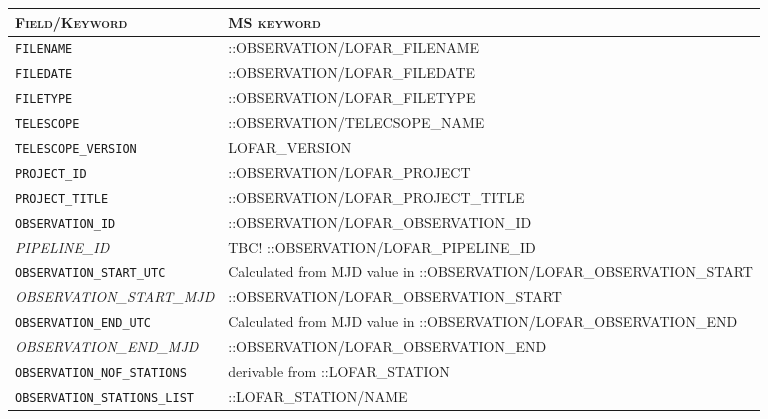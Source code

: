 \documentclass[a4paper,10pt,bibtotoc]{scrartcl}
\begin{document}
\begin{table}[H]
  \centering
  \begin{tabular}{|ll|}


    \hline
    \textsc{Field/Keyword} & \textsc{MS keyword} \\
    \hline \hline

    \small \verb|FILENAME| & ::OBSERVATION/LOFAR\_FILENAME \\
    \small \verb|FILEDATE| & ::OBSERVATION/LOFAR\_FILEDATE \\
    \small \verb|FILETYPE| & ::OBSERVATION/LOFAR\_FILETYPE \\
    \small \verb|TELESCOPE| & ::OBSERVATION/TELECSOPE\_NAME \\
    \small \verb|TELESCOPE_VERSION| & LOFAR\_VERSION\\
    \small \verb|PROJECT_ID| & ::OBSERVATION/LOFAR\_PROJECT\\
    \small \verb|PROJECT_TITLE| & ::OBSERVATION/LOFAR\_PROJECT\_TITLE \\
    \small \verb|OBSERVATION_ID| & ::OBSERVATION/LOFAR\_OBSERVATION\_ID \\
    \small{\textit{PIPELINE\_ID}} & TBC! ::OBSERVATION/LOFAR\_PIPELINE\_ID \\
    \small \verb|OBSERVATION_START_UTC| & Calculated from MJD value in ::OBSERVATION/LOFAR\_OBSERVATION\_START\\
    \small{\textit{OBSERVATION\_START\_MJD}} & ::OBSERVATION/LOFAR\_OBSERVATION\_START\\
    \small{\texttt{OBSERVATION\_END\_UTC}} & Calculated from MJD value in ::OBSERVATION/LOFAR\_OBSERVATION\_END\\
    \small{\textit{OBSERVATION\_END\_MJD}} & ::OBSERVATION/LOFAR\_OBSERVATION\_END\\
    \small{\texttt{OBSERVATION\_NOF\_STATIONS}}  & derivable from ::LOFAR\_STATION\\
    \small{\texttt{OBSERVATION\_STATIONS\_LIST}} & ::LOFAR\_STATION/NAME \\

\end{tabular}
\end{table}
\end{document}
